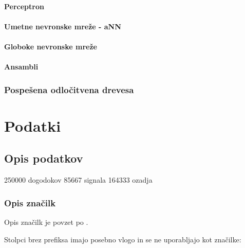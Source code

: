\documentclass[11pt,a4paper,openany]{book}
\begin{document}
\subsubsection{Perceptron}

\subsubsection{Umetne nevronske mreže - aNN}

\subsubsection{Globoke nevronske mreže}

\subsubsection{Ansambli}

\subsection{Pospešena odločitvena drevesa}


\chapter{Podatki}
\label{analiza-podatkov}

\section{Opis podatkov}

250000 dogodokov
85667 signala
164333 ozadja


\subsection{Opis značilk}

Opis značilk je povzet po \cite{Adam-Bourdarios14}.

Stolpci brez prefiksa imajo posebno vlogo in se ne uporabljajo kot značilke:
\end{document}
